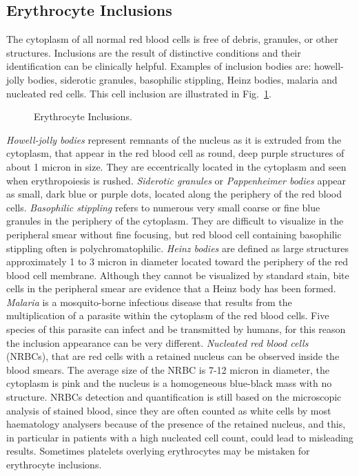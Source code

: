 \documentclass[final,a4paper,12pt,english]{UnicaPhdThesis3}
\begin{document}
	\subsection{Erythrocyte Inclusions}
	The cytoplasm of all normal red blood cells is free of debris, granules, or other structures. Inclusions are the result of distinctive conditions and their identification can be clinically helpful. Examples of inclusion bodies are: howell-jolly bodies, siderotic granules, basophilic stippling, Heinz bodies, malaria and nucleated red cells. This cell inclusion are illustrated in Fig.~\ref{fig:Inclusions}.
	
	\begin{figure}[!htbp]
		\centering
		\caption{\label{fig:Inclusions} Erythrocyte Inclusions.}
	\end{figure}
	
	\textit{Howell-jolly bodies} represent remnants of the nucleus as it is extruded from the cytoplasm, that appear in the red blood cell as round, deep purple structures of about 1 micron in size. They are eccentrically located in the cytoplasm and seen when erythropoiesis is rushed. \textit{Siderotic granules} or \textit{Pappenheimer bodies} appear as small, dark blue or purple dots, located along the periphery of the red blood cells. \textit{Basophilic stippling} refers to numerous very small coarse or fine blue granules in the periphery of the cytoplasm. They are difficult to visualize in the peripheral smear without fine focusing, but red blood cell containing basophilic stippling often is polychromatophilic. \textit{Heinz bodies} are defined as large structures approximately 1 to 3 micron in diameter located toward the periphery of the red blood cell membrane. Although they cannot be visualized by standard stain, bite cells in the peripheral smear are evidence that a Heinz body has been formed. \textit{Malaria} is a mosquito-borne infectious disease that results from the multiplication of a parasite within the cytoplasm of the red blood cells. Five species of this parasite can infect and be transmitted by humans, for this reason the inclusion appearance can be very different. \textit{Nucleated red blood cells} (NRBCs), that are red cells with a retained nucleus can be observed inside the blood smears. The average size of the NRBC is 7-12 micron in diameter, the cytoplasm is pink and the nucleus is a homogeneous blue-black mass with no structure. NRBCs detection and quantification is still based on the microscopic analysis of stained blood, since they are often counted as white cells by most haematology analysers because of the presence of the retained nucleus, and this, in particular in patients with a high nucleated cell count, could lead to misleading results. Sometimes platelets overlying erythrocytes may be mistaken for erythrocyte inclusions. 
	
\end{document}
